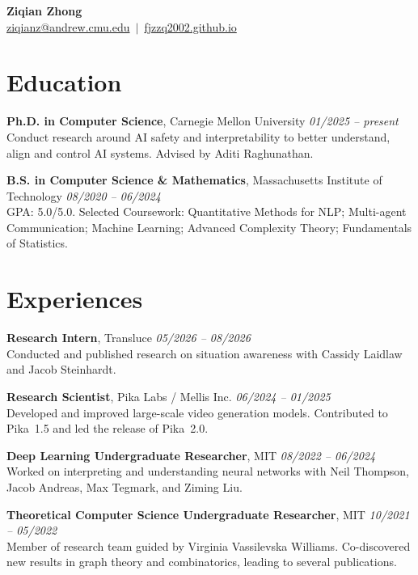 \documentclass[11pt,letterpaper]{article}
\makeatletter
\newcommand{\daterange}[3][]{%
  \hfill \textit{#2 -- #3} \vspace{1mm}
}
\newcommand{\myname}{{\LARGE \textbf{Ziqian Zhong}}}
\newcommand{\email}{\href{mailto:ziqianz@andrew.cmu.edu}{ziqianz@andrew.cmu.edu}}
\newcommand{\github}{\href{https://fjzzq2002.github.io}{fjzzq2002.github.io}}
\makeatother
\begin{document}
\myname\\[2pt]
{\large \email\ $\mid$\ \github}

\section*{Education}
\textbf{Ph.D. in Computer Science}, Carnegie Mellon University \daterange[Pittsburgh,~PA]{01/2025}{present}\\
Conduct research around AI safety and interpretability to better understand, align and control AI systems. Advised by Aditi Raghunathan.

\vspace{4pt}
\textbf{B.S. in Computer Science \& Mathematics}, Massachusetts Institute of Technology \daterange[Cambridge,~MA]{08/2020}{06/2024}\\
GPA: 5.0/5.0. Selected Coursework: Quantitative Methods for NLP; Multi-agent Communication; Machine Learning; Advanced Complexity Theory; Fundamentals of Statistics.

\section*{Experiences}

\textbf{Research Intern}, Transluce \daterange[San Francisco,~CA]{05/2026}{08/2026}\\
Conducted and published research on situation awareness with Cassidy Laidlaw and Jacob Steinhardt.

\vspace{4pt}
\textbf{Research Scientist}, Pika Labs / Mellis Inc. \daterange[Palo Alto,~CA]{06/2024}{01/2025}\\
Developed and improved large-scale video generation models. Contributed to Pika~1.5 and led the release of Pika~2.0.

\vspace{4pt}
\textbf{Deep Learning Undergraduate Researcher}, MIT \daterange[Cambridge,~MA]{08/2022}{06/2024}\\
Worked on interpreting and understanding neural networks with Neil Thompson, Jacob Andreas, Max Tegmark, and Ziming Liu.

\vspace{4pt}
\textbf{Theoretical Computer Science Undergraduate Researcher}, MIT \daterange[Cambridge,~MA]{10/2021}{05/2022}\\
Member of research team guided by Virginia Vassilevska Williams. Co-discovered new results in graph theory and combinatorics, leading to several publications.
\end{document}
